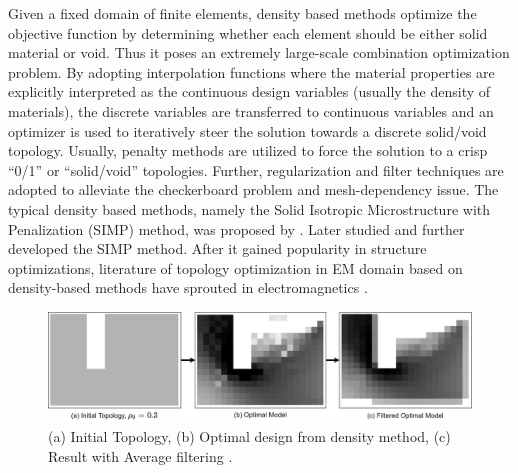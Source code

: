 Given a fixed domain of finite elements, density based methods optimize the objective  function  by  determining  whether  each  element  should  be either solid  material  or void. Thus it poses an extremely large-scale combination optimization problem. By adopting interpolation  functions  where  the material  properties  are  explicitly  interpreted  as  the continuous design  variables  (usually  the  density  of  materials),  the  discrete  variables  are transferred to continuous variables and an optimizer is used to iteratively steer the solution towards  a  discrete  solid/void  topology.  Usually,  penalty  methods  are  utilized  to  force  the solution  to  a  crisp  “0/1”  or  “solid/void”  topologies.  Further,  regularization  and  filter techniques are adopted to alleviate the checkerboard problem and mesh-dependency issue. The  typical  density  based  methods,  namely  the  Solid Isotropic Microstructure with Penalization (SIMP) method, was proposed  by \parencite{bendsoe1989optimal}. Later \parencite{rozvany1991coc} studied  and  further developed the SIMP method. After it gained popularity in structure optimizations, literature of topology optimization in EM domain based on density-based methods have sprouted in electromagnetics \parencite{yoo2005optimal, byun2002topology, wang2004multi, okamoto20063}.

\begin{figure}[h!]
    \centering
    \includegraphics[width=\textwidth]{Figures/Ch_MDP/density_c_core_final.png}
    \caption{(a) Initial Topology, (b) Optimal design from density method, (c) Result with Average filtering \parencite{midha2019selection}.}
    \label{fig:MDP_density_c_core}
\end{figure}

